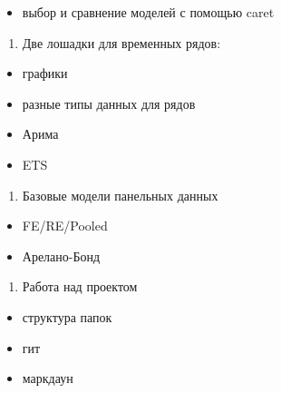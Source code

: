 \documentclass[russian,]{book}
\providecommand{\tightlist}{%
  \setlength{\itemsep}{0pt}\setlength{\parskip}{0pt}}
\begin{document}
\begin{itemize}
\tightlist
\item
  выбор и сравнение моделей с помощью caret
\end{itemize}

\begin{enumerate}
\def\labelenumi{\arabic{enumi}.}
\tightlist
\item
  Две лошадки для временных рядов:
\end{enumerate}

\begin{itemize}
\tightlist
\item
  графики
\item
  разные типы данных для рядов
\item
  Арима
\item
  ETS
\end{itemize}

\begin{enumerate}
\def\labelenumi{\arabic{enumi}.}
\tightlist
\item
  Базовые модели панельных данных
\end{enumerate}

\begin{itemize}
\tightlist
\item
  FE/RE/Pooled
\item
  Арелано-Бонд
\end{itemize}

\begin{enumerate}
\def\labelenumi{\arabic{enumi}.}
\tightlist
\item
  Работа над проектом
\end{enumerate}

\begin{itemize}
\tightlist
\item
  структура папок
\item
  гит
\item
  маркдаун
\end{itemize}


\end{document}
